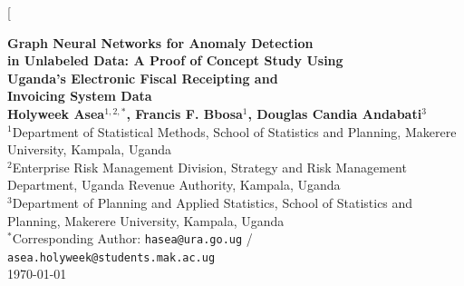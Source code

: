 \documentclass[10pt,twocolumn]{article}
\begin{document}
\twocolumn[{%
\begin{@twocolumnfalse}
\vspace*{4pt}
\begin{center}
  {\LARGE\bfseries Graph Neural Networks for Anomaly Detection\\[4pt]
   in Unlabeled Data: A Proof of Concept Study Using\\[4pt]
   Uganda's Electronic Fiscal Receipting and\\[4pt]
   Invoicing System Data}\\[14pt]
  {\large\bfseries Holyweek Asea$^{1,2,*}$, Francis F. Bbosa$^{1}$, Douglas Candia Andabati$^{3}$}\\[8pt]
  {\normalsize $^{1}$Department of Statistical Methods, School of Statistics and Planning, Makerere University, Kampala, Uganda}\\[2pt]
  {\normalsize $^{2}$Enterprise Risk Management Division, Strategy and Risk Management Department, Uganda Revenue Authority, Kampala, Uganda}\\[2pt]
  {\normalsize $^{3}$Department of Planning and Applied Statistics, School of Statistics and Planning, Makerere University, Kampala, Uganda}\\[4pt]
  {\normalsize $^{*}$Corresponding Author: \texttt{hasea@ura.go.ug} / \texttt{asea.holyweek@students.mak.ac.ug}}\\[14pt]
  \today
\end{center}


\end{@twocolumnfalse}}
\end{document}
